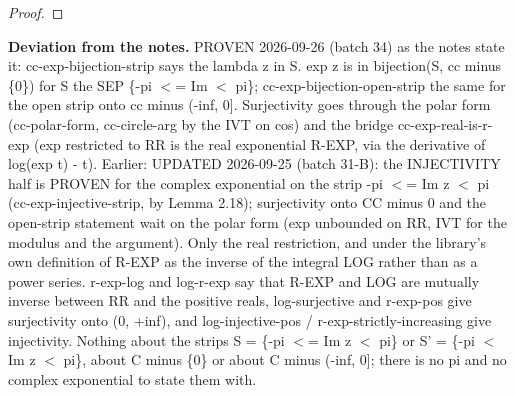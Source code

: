 \begin{proof}
%
%
%
%
%
%
\end{proof}
%
\noindent\textbf{Deviation from the notes.} PROVEN 2026-09-26 (batch 34) as the notes state it: cc-exp-bijection-strip says the lambda z in S. exp z is in bijection(S, cc minus \{0\}) for S the SEP \{-pi $<$= Im $<$ pi\}; cc-exp-bijection-open-strip the same for the open strip onto cc minus (-inf, 0]. Surjectivity goes through the polar form (cc-polar-form, cc-circle-arg by the IVT on cos) and the bridge cc-exp-real-is-r-exp (exp restricted to RR is the real exponential R-EXP, via the derivative of log(exp t) - t). Earlier: UPDATED 2026-09-25 (batch 31-B): the INJECTIVITY half is PROVEN for the complex exponential on the strip -pi $<$= Im z $<$ pi (cc-exp-injective-strip, by Lemma 2.18); surjectivity onto CC minus 0 and the open-strip statement wait on the polar form (exp unbounded on RR, IVT for the modulus and the argument). Only the real restriction, and under the library's own definition of R-EXP as the inverse of the integral LOG rather than as a power series. r-exp-log and log-r-exp say that R-EXP and LOG are mutually inverse between RR and the positive reals, log-surjective and r-exp-pos give surjectivity onto (0, +inf), and log-injective-pos / r-exp-strictly-increasing give injectivity. Nothing about the strips S = \{-pi $<$= Im z $<$ pi\} or S' = \{-pi $<$ Im z $<$ pi\}, about C minus \{0\} or about C minus (-inf, 0]; there is no pi and no complex exponential to state them with.
%
\renewcommand{\thethm}{2.20}
